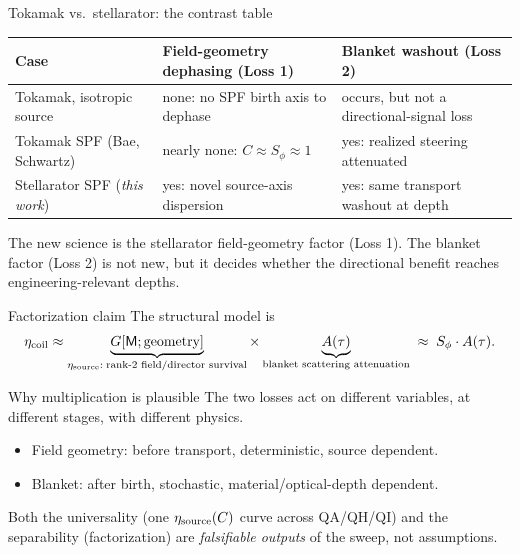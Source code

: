 \documentclass[aspectratio=169]{beamer}
\newcommand{\M}{\mathsf M}
\newcommand{\Sphi}{S_\phi}
\begin{document}
\begin{frame}[t]{Tokamak vs.\ stellarator: the contrast table}
\renewcommand{\arraystretch}{1.25}
\begin{center}
\begin{tabular}{>{\raggedright\arraybackslash}p{}
                >{\raggedright\arraybackslash}p{}
                >{\raggedright\arraybackslash}p{}}
\toprule
Case & Field-geometry dephasing (Loss 1) & Blanket washout (Loss 2) \\
\midrule
Tokamak, isotropic source & none: no SPF birth axis to dephase & occurs, but not a directional-signal loss \\
Tokamak SPF (Bae, Schwartz) & nearly none: $C\approx\Sphi\approx 1$ & yes: realized steering attenuated \\
Stellarator SPF (\emph{this work}) & \alert{yes: novel source-axis dispersion} & yes: same transport washout at depth \\
\bottomrule
\end{tabular}
\end{center}
\vspace{0.6em}
The new science is the stellarator field-geometry factor (Loss 1). The blanket factor (Loss 2) is not new, but it decides whether the directional benefit reaches engineering-relevant depths.
\end{frame}

\begin{frame}[t]{Factorization claim}
The structural model is
\[
\eta_{\rm coil}
\approx
\underbrace{G[\M;\text{geometry}]}_{\eta_{\rm source}:\;\text{rank-2 field/director survival}}
\times
\underbrace{A(\tau)}_{\text{blanket scattering attenuation}}
\;\approx\; \Sphi\cdot A(\tau).
\]
\begin{block}{Why multiplication is plausible}
The two losses act on different variables, at different stages, with different physics.
\end{block}
\begin{itemize}
  \item Field geometry: before transport, deterministic, source dependent.
  \item Blanket: after birth, stochastic, material/optical-depth dependent.
\end{itemize}
Both the universality (one $\eta_{\rm source}(C)$ curve across QA/QH/QI) and the separability (factorization) are \emph{falsifiable outputs} of the sweep, not assumptions.
\end{frame}
\end{document}
